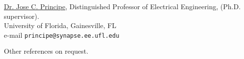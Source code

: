 
\href{http://www.cnel.ufl.edu/principe/principe.html}{Dr. Jose C. Principe}, Distinguished Professor of Electrical Engineering, (Ph.D. supervisor).\\
University of Florida, Gainesville, FL \\
e-mail \texttt{principe@synapse.ee.ufl.edu}


\par
Other references on request.